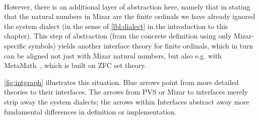 \paragraph{}However, there is an additional layer of abstraction here, namely that in stating that the natural numbers in Mizar are the finite ordinals we have already ignored the system dialect (in the sense of \autoref{lbl:dialect} in the introduction to this chapter). This step of abstraction (from the concrete definition using only Mizar-specific symbols) yields another interface theory for finite ordinals, which in turn can be aligned not just with Mizar natural numbers, but also e.g. with MetaMath~\cite{MetaMath:on}, which is built on ZFC set theory.

\autoref{fig:intgraph} illustrates this situation. Blue arrows point from more detailed theories to their interfaces. The arrows from PVS or Mizar to interfaces merely strip away the system dialects; the arrows within Interfaces abstract away more fundamental differences in definition or implementation.


